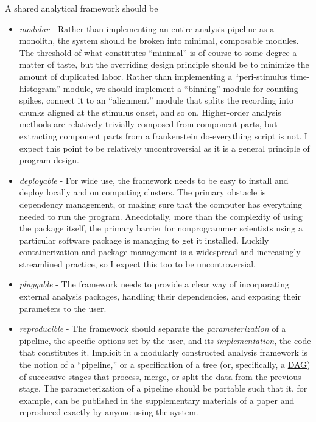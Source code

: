 \documentclass{article}
\begin{document}
A shared analytical framework should be

\begin{itemize}

\item
  \emph{modular} - Rather than implementing an entire analysis pipeline
  as a monolith, the system should be broken into minimal, composable
  modules. The threshold of what constitutes ``minimal'' is of course to
  some degree a matter of taste, but the overriding design principle
  should be to minimize the amount of duplicated labor. Rather than
  implementing a ``peri-stimulus time-histogram'' module, we should
  implement a ``binning'' module for counting spikes, connect it to an
  ``alignment'' module that splits the recording into chunks aligned at
  the stimulus onset, and so on. Higher-order analysis methods are
  relatively trivially composed from component parts, but extracting
  component parts from a frankenstein do-everything script is not. I
  expect this point to be relatively uncontroversial as it is a general
  principle of program design.
\item
  \emph{deployable} - For wide use, the framework needs to be easy to
  install and deploy locally and on computing clusters. The primary
  obstacle is dependency management, or making sure that the computer
  has everything needed to run the program. Anecdotally, more than the
  complexity of using the package itself, the primary barrier for
  nonprogrammer scientists using a particular software package is
  managing to get it installed. Luckily containerization and package
  management is a widespread and increasingly streamlined practice, so I
  expect this too to be uncontroversial.
\item
  \emph{pluggable} - The framework needs to provide a clear way of
  incorporating external analysis packages, handling their dependencies,
  and exposing their parameters to the user.
\item
  \emph{reproducible} - The framework should separate the
  \emph{parameterization} of a pipeline, the specific options set by the
  user, and its \emph{implementation}, the code that constitutes it.
  Implicit in a modularly constructed analysis framework is the notion
  of a ``pipeline,'' or a specification of a tree (or, specifically, a
  \href{https://en.wikipedia.org/wiki/Directed_acyclic_graph}{DAG}) of
  successive stages that process, merge, or split the data from the
  previous stage. The parameterization of a pipeline should be portable
  such that it, for example, can be published in the supplementary
  materials of a paper and reproduced exactly by anyone using the
  system.
\end{itemize}
\end{document}
